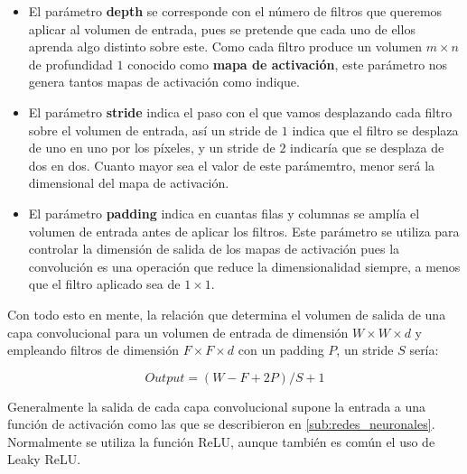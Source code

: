             \begin{itemize}
                \item El parámetro \textbf{depth} se corresponde con el número de filtros que queremos aplicar al volumen de entrada, pues se pretende que cada uno de ellos aprenda algo distinto sobre este. Como cada filtro produce un volumen $m \times n$ de profundidad $1$ conocido como \textbf{mapa de activación}, este parámetro nos genera tantos mapas de activación como indique.
                \item El parámetro \textbf{stride} indica el paso con el que vamos desplazando cada filtro sobre el volumen de entrada, así un stride de $1$ indica que el filtro se desplaza de uno en uno por los píxeles, y un stride de $2$ indicaría que se desplaza de dos en dos. Cuanto mayor sea el valor de este parámemtro, menor será la dimensional del mapa de activación.
                \item El parámetro \textbf{padding} indica en cuantas filas y columnas se amplía el volumen de entrada antes de aplicar los filtros. Este parámetro se utiliza para controlar la dimensión de salida de los mapas de activación pues la convolución es una operación que reduce la dimensionalidad siempre, a menos que el filtro aplicado sea de $1 \times 1$.
            \end{itemize}

            \noindent Con todo esto en mente, la relación que determina el volumen de salida de una capa convolucional para un volumen de entrada de dimensión $W \times W \times d$ y empleando filtros de dimensión $F \times F \times d$ con un padding $P$, un stride $S$ sería: 

            \begin{equation}
                Output=(W-F + 2P)/S + 1
            \end{equation}

            \medskip
            
            \noindent Generalmente la salida de cada capa convolucional supone la entrada a una función de activación como las que se describieron en \autoref{sub:redes_neuronales}. Normalmente se utiliza la función ReLU, aunque también es común el uso de Leaky ReLU.

